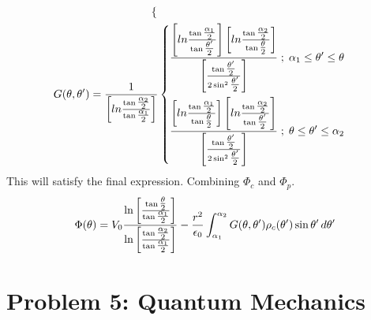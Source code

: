 \documentclass{article}
\begin{document}
{\begin{equation*}
\begin{split}
\begin{dcases}
				\end{dcases} \\
				G(\theta,\theta') = \frac{1}{\left[ln \tfrac{\tan \tfrac{\alpha_2}{2}}{\tan \tfrac{\alpha_1}{2}} \right]}
				&\begin{dcases}
					\frac{\left[ln \tfrac{\tan \tfrac{\alpha_1}{2}}{\tan \tfrac{\theta'}{2}}\right] \left[ln \tfrac{\tan \tfrac{\alpha_2}{2}}{\tan \tfrac{\theta}{2}}\right] }{\left[ \tfrac{\tan \tfrac{\theta'}{2}}{2\sin^2 \tfrac{\theta'}{2}} \right] } \; ; \; \alpha_1 \leq \theta' \leq \theta \\
					\frac{\left[ln \tfrac{\tan \tfrac{\alpha_1}{2}}{\tan \tfrac{\theta}{2}}\right] \left[ln \tfrac{\tan \tfrac{\alpha_2}{2}}{\tan \tfrac{\theta'}{2}}\right] }{\left[ \tfrac{\tan \tfrac{\theta'}{2}}{2\sin^2 \tfrac{\theta'}{2}} \right] } \; ; \; \theta \leq \theta' \leq \alpha_2
				\end{dcases}
			\end{split}
		\end{equation*}
		This will satisfy the final expression. Combining $\Phi_c$ and $\Phi_p$.
		\begin{equation*}
			\Phi(\theta) = V_0 \frac{ \ln \left[ \frac{\tan \tfrac{\theta}{2}} {\tan \tfrac{\alpha_1}{2}} \right] }{ \ln \left[ \frac{\tan \tfrac{\alpha_2}{2}} {\tan \tfrac{\alpha_1}{2}} \right] } - \frac{r^2}{\epsilon_0} \int_{\alpha_1}^{\alpha_2} G(\theta, \theta') \rho_c (\theta') \sin \theta' \, d\theta' \\
		\end{equation*}
	\clearpage
	\section*{Problem 5: Quantum Mechanics}
}
\end{document}
